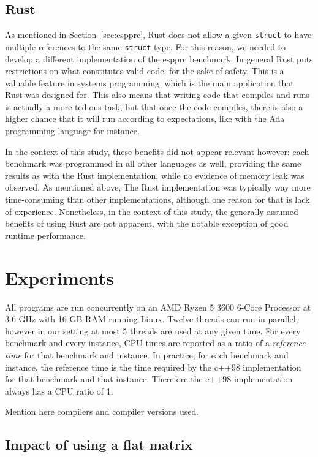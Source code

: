 \documentclass[11pt,a4paper,notitlepage]{article}
\begin{document}
\subsection{Rust}
As mentioned in Section~\ref{sec:espprc}, Rust does not allow a given
\verb|struct| to have multiple references to the same \verb|struct|
type. For this reason, we needed to develop a different implementation
of the espprc benchmark. In general Rust puts restrictions on what
constitutes valid code, for the sake of safety. This is a valuable
feature in systems programming, which is the main application that Rust was
designed for. This also means that writing code that compiles and runs
is actually a more tedious task, but that once the code compiles,
there is also a higher chance that it will run according to
expectations, like with the Ada programming language for instance.

In the context of this study, these benefits did not appear relevant
however: each benchmark was programmed in all other languages as well,
providing the same results as with the Rust implementation, while no
evidence of memory leak was observed. As mentioned above, The Rust
implementation was typically way more time-consuming than other
implementations, although one reason for that is lack of
experience. Nonetheless, in the context of this study, the generally
assumed benefits of using Rust are not apparent, with the notable
exception of good runtime performance.

\section{Experiments}
All programs are run concurrently on an AMD Ryzen 5 3600 6-Core
Processor at 3.6 GHz with 16 GB RAM running Linux. Twelve threads can
run in parallel, however in our setting at most 5 threads are used at
any given time. For every benchmark and every instance, CPU times are
reported as a ratio of a \emph{reference time} for that benchmark and
instance. In practice, for each benchmark and instance, the reference
time is the time required by the c++98 implementation for that
benchmark and that instance. Therefore the c++98 implementation always
has a CPU ratio of 1.

Mention here compilers and compiler versions used.

\subsection{Impact of using a flat matrix}
\end{document}
